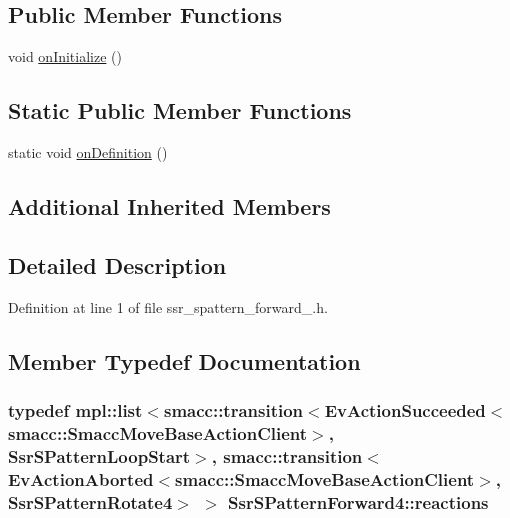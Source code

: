\subsection*{Public Member Functions}
\begin{DoxyCompactItemize}
\item 
void \hyperlink{structSsrSPatternForward4_ad0ad8bfc383496145a5e535031286f73}{on\+Initialize} ()
\end{DoxyCompactItemize}
\subsection*{Static Public Member Functions}
\begin{DoxyCompactItemize}
\item 
static void \hyperlink{structSsrSPatternForward4_a6d79c39c58f9838e0d15ef954f7678ff}{on\+Definition} ()
\end{DoxyCompactItemize}
\subsection*{Additional Inherited Members}


\subsection{Detailed Description}


Definition at line 1 of file ssr\+\_\+spattern\+\_\+forward\+\_.\+h.



\subsection{Member Typedef Documentation}
\subsubsection[{\texorpdfstring{reactions}{reactions}}]{\setlength{\rightskip}{0pt plus 5cm}typedef mpl\+::list$<${\bf smacc\+::transition}$<$Ev\+Action\+Succeeded$<${\bf smacc\+::\+Smacc\+Move\+Base\+Action\+Client}$>$, {\bf Ssr\+S\+Pattern\+Loop\+Start}$>$, {\bf smacc\+::transition}$<$Ev\+Action\+Aborted$<${\bf smacc\+::\+Smacc\+Move\+Base\+Action\+Client}$>$, {\bf Ssr\+S\+Pattern\+Rotate4}$>$ $>$ {\bf Ssr\+S\+Pattern\+Forward4\+::reactions}}\hypertarget{structSsrSPatternForward4_ae4939b34f84c1cf199f8c109394d23ae}{}\label{structSsrSPatternForward4_ae4939b34f84c1cf199f8c109394d23ae}



